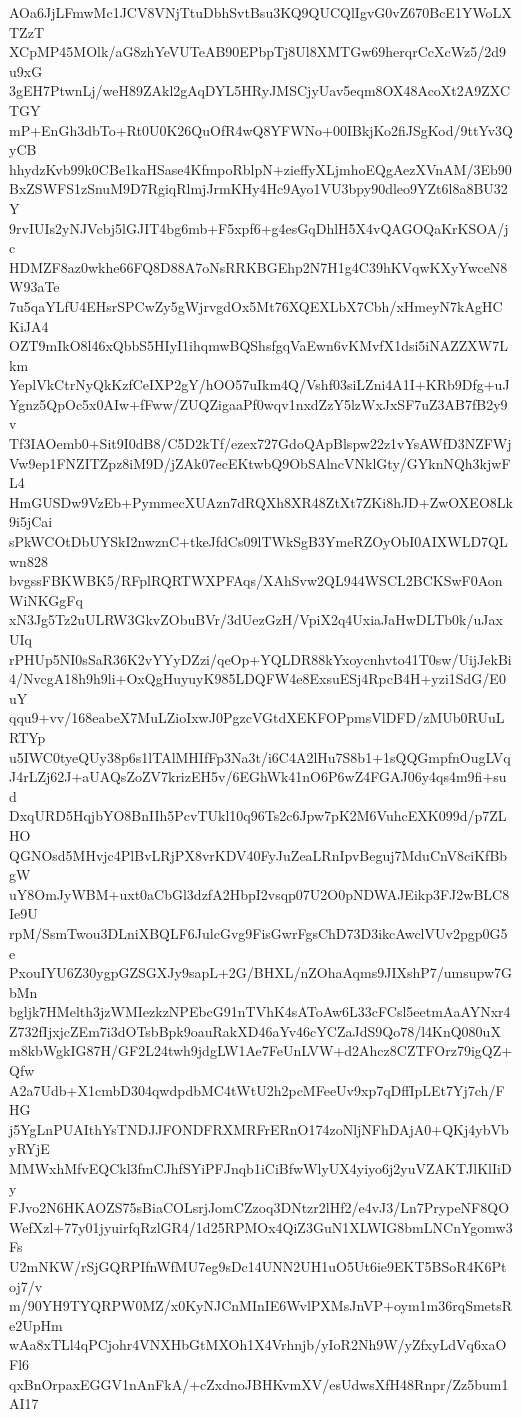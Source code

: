 AOa6JjLFmwMc1JCV8VNjTtuDbhSvtBsu3KQ9QUCQlIgvG0vZ670BcE1YWoLXTZzT
XCpMP45MOlk/aG8zhYeVUTeAB90EPbpTj8Ul8XMTGw69herqrCcXcWz5/2d9u9xG
3gEH7PtwnLj/weH89ZAkl2gAqDYL5HRyJMSCjyUav5eqm8OX48AcoXt2A9ZXCTGY
mP+EnGh3dbTo+Rt0U0K26QuOfR4wQ8YFWNo+00IBkjKo2fiJSgKod/9ttYv3QyCB
hhydzKvb99k0CBe1kaHSase4KfmpoRblpN+zieffyXLjmhoEQgAezXVnAM/3Eb90
BxZSWFS1zSnuM9D7RgiqRlmjJrmKHy4Hc9Ayo1VU3bpy90dleo9YZt6l8a8BU32Y
9rvIUIs2yNJVcbj5lGJIT4bg6mb+F5xpf6+g4esGqDhlH5X4vQAGOQaKrKSOA/jc
HDMZF8az0wkhe66FQ8D88A7oNsRRKBGEhp2N7H1g4C39hKVqwKXyYwceN8W93aTe
7u5qaYLfU4EHsrSPCwZy5gWjrvgdOx5Mt76XQEXLbX7Cbh/xHmeyN7kAgHCKiJA4
OZT9mIkO8l46xQbbS5HIyI1ihqmwBQShsfgqVaEwn6vKMvfX1dsi5iNAZZXW7Lkm
YeplVkCtrNyQkKzfCeIXP2gY/hOO57uIkm4Q/Vshf03siLZni4A1I+KRb9Dfg+uJ
Ygnz5QpOc5x0AIw+fFww/ZUQZigaaPf0wqv1nxdZzY5lzWxJxSF7uZ3AB7fB2y9v
Tf3IAOemb0+Sit9I0dB8/C5D2kTf/ezex727GdoQApBlspw22z1vYsAWfD3NZFWj
Vw9ep1FNZITZpz8iM9D/jZAk07ecEKtwbQ9ObSAlncVNklGty/GYknNQh3kjwFL4
HmGUSDw9VzEb+PymmecXUAzn7dRQXh8XR48ZtXt7ZKi8hJD+ZwOXEO8Lk9i5jCai
sPkWCOtDbUYSkI2nwznC+tkeJfdCs09lTWkSgB3YmeRZOyObI0AIXWLD7QLwn828
bvgssFBKWBK5/RFplRQRTWXPFAqs/XAhSvw2QL944WSCL2BCKSwF0AonWiNKGgFq
xN3Jg5Tz2uULRW3GkvZObuBVr/3dUezGzH/VpiX2q4UxiaJaHwDLTb0k/uJaxUIq
rPHUp5NI0sSaR36K2vYYyDZzi/qeOp+YQLDR88kYxoycnhvto41T0sw/UijJekBi
4/NvcgA18h9h9li+OxQgHuyuyK985LDQFW4e8ExsuESj4RpcB4H+yzi1SdG/E0uY
qqu9+vv/168eabeX7MuLZioIxwJ0PgzcVGtdXEKFOPpmsVlDFD/zMUb0RUuLRTYp
u5IWC0tyeQUy38p6s1lTAlMHIfFp3Na3t/i6C4A2lHu7S8b1+1sQQGmpfnOugLVq
J4rLZj62J+aUAQsZoZV7krizEH5v/6EGhWk41nO6P6wZ4FGAJ06y4qs4m9fi+sud
DxqURD5HqjbYO8BnIIh5PcvTUkl10q96Ts2c6Jpw7pK2M6VuhcEXK099d/p7ZLHO
QGNOsd5MHvjc4PlBvLRjPX8vrKDV40FyJuZeaLRnIpvBeguj7MduCnV8ciKfBbgW
uY8OmJyWBM+uxt0aCbGl3dzfA2HbpI2vsqp07U2O0pNDWAJEikp3FJ2wBLC8Ie9U
rpM/SsmTwou3DLniXBQLF6JulcGvg9FisGwrFgsChD73D3ikcAwclVUv2pgp0G5e
PxouIYU6Z30ygpGZSGXJy9sapL+2G/BHXL/nZOhaAqms9JIXshP7/umsupw7GbMn
bgljk7HMelth3jzWMIezkzNPEbcG91nTVhK4sAToAw6L33cFCsl5eetmAaAYNxr4
Z732fIjxjcZEm7i3dOTsbBpk9oauRakXD46aYv46cYCZaJdS9Qo78/l4KnQ080uX
m8kbWgkIG87H/GF2L24twh9jdgLW1Ae7FeUnLVW+d2Ahcz8CZTFOrz79igQZ+Qfw
A2a7Udb+X1cmbD304qwdpdbMC4tWtU2h2pcMFeeUv9xp7qDffIpLEt7Yj7ch/FHG
j5YgLnPUAIthYsTNDJJFONDFRXMRFrERnO174zoNljNFhDAjA0+QKj4ybVbyRYjE
MMWxhMfvEQCkl3fmCJhfSYiPFJnqb1iCiBfwWlyUX4yiyo6j2yuVZAKTJlKlIiDy
FJvo2N6HKAOZS75sBiaCOLsrjJomCZzoq3DNtzr2lHf2/e4vJ3/Ln7PrypeNF8QO
WefXzl+77y01jyuirfqRzlGR4/1d25RPMOx4QiZ3GuN1XLWIG8bmLNCnYgomw3Fs
U2mNKW/rSjGQRPIfnWfMU7eg9sDc14UNN2UH1uO5Ut6ie9EKT5BSoR4K6Ptoj7/v
m/90YH9TYQRPW0MZ/x0KyNJCnMInIE6WvlPXMsJnVP+oym1m36rqSmetsRe2UpHm
wAa8xTLl4qPCjohr4VNXHbGtMXOh1X4Vrhnjb/yIoR2Nh9W/yZfxyLdVq6xaOFl6
qxBnOrpaxEGGV1nAnFkA/+cZxdnoJBHKvmXV/esUdwsXfH48Rnpr/Zz5bum1AI17
